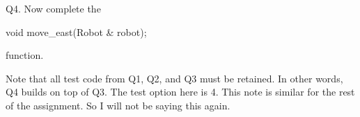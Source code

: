 Q4.
Now complete the
{\small
\begin{console}
void move_east(Robot & robot);
\end{console}
}
function.

Note that all test code from Q1, Q2, and Q3 must be retained.
In other words, Q4 builds on top of Q3.
The test option here is 4.
This note is similar for the rest of the assignment.
So I will not be saying this again.


